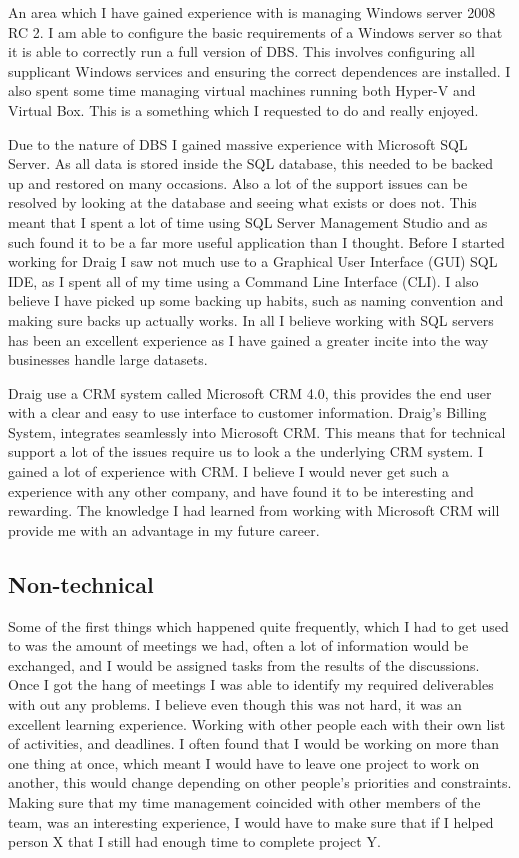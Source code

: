 \documentclass[paper=a4, fontsize=11pt]{scrartcl}	%
\begin{document}
An area which I have gained experience with is managing Windows server 2008 RC 2. I am able to configure the basic requirements of a Windows server so that it is able to correctly run a full version of DBS. This involves configuring all supplicant Windows services and ensuring the correct dependences are installed. I also spent some time managing virtual machines running both Hyper-V\cite{hyperv} and Virtual Box\cite{vbox}. This is a something which I requested to do and really enjoyed.

Due to the nature of DBS I gained massive experience with Microsoft SQL Server. As all data is stored inside the SQL database, this needed to be backed up and restored on many occasions. Also a lot of the support issues can be resolved by looking at the database and seeing what exists or does not. This meant that I spent a lot of time using SQL Server Management Studio and as such found it to be a far more useful application than I thought. Before I started working for Draig I saw not much use to a Graphical User Interface (GUI) SQL IDE, as I spent all of my time using a Command Line Interface (CLI). I also believe I have picked up some backing up habits, such as naming convention and making sure backs up actually works. In all I believe working with SQL servers has been an excellent experience as I have gained a greater incite into the way businesses handle large datasets. 

Draig use a CRM system called Microsoft CRM 4.0, this provides the end user with a clear and easy to use interface to customer information. Draig's Billing System, integrates seamlessly into Microsoft CRM. This means that for technical support a lot of the issues require us to look a the underlying CRM system. I gained a lot of experience with CRM. I believe I would never get such a experience with any other company, and have found it to be interesting and rewarding. The knowledge I had learned from working with Microsoft CRM will provide me with an advantage in my future career. 

\subsection{Non-technical}
Some of the first things which happened quite frequently, which I had to get used to was the amount of meetings we had, often a lot of information would be exchanged, and I would be assigned tasks from the results of the discussions. Once I got the hang of meetings I was able to identify my required deliverables with out any problems. I believe even though this was not hard, it was an excellent learning experience. Working with other people each with their own list of activities, and deadlines. I often found that I would be working on more than one thing at once, which meant I would have to leave one project to work on another, this would change depending on other people's priorities and constraints. Making sure that my time management coincided with other members of the team, was an interesting experience, I would have to make sure that if I helped person X that I still had enough time to complete project Y.
\end{document}
